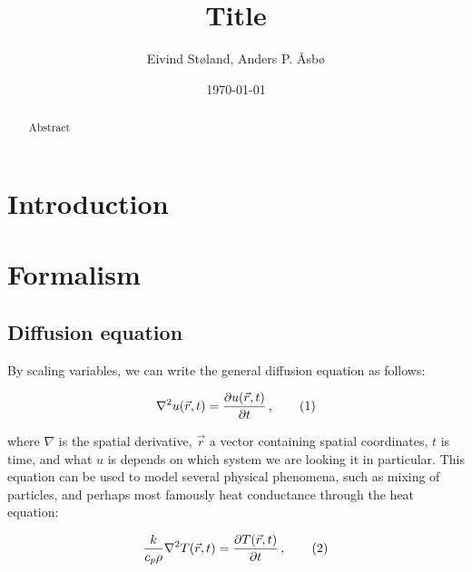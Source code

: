 \documentclass[reprint,english,notitlepage]{revtex4-1}  %
\newcommand\numberthis{\addtocounter{equation}{1}\tag{\theequation}}
\begin{document}
\title{Title}   %
\author{Eivind Støland, Anders P. Åsbø}               %
\date{\today}                             %
\noaffiliation                            %

\begin{abstract}
Abstract
\end{abstract}

\maketitle                                %


\tableofcontents

\section{Introduction} \label{sec:introduction}


\clearpage

\section{Formalism} \label{sec:formalism}

\subsection{Diffusion equation} \label{sec:formalism_diffusion_equation}

By scaling variables, we can write the general diffusion equation as follows:

\begin{align*}
\nabla^2 u(\vec{r},t) = \frac{\partial u(\vec{r},t)}{\partial t} \, , \numberthis \label{eq:3D_diff_eq}
\end{align*}

where $\nabla$ is the spatial derivative, $\vec{r}$ a vector containing spatial coordinates, $t$ is time, and what $u$ is depends on which system we are looking it in particular. This equation can be used to model several physical phenomena, such as mixing of particles, and perhaps most famously heat conductance through the heat equation:

\begin{align*}
\frac{k}{c_p \rho} \nabla^2 T(\vec{r},t) = \frac{\partial T (\vec{r},t)}{\partial t} \, , \numberthis \label{eq:heat_equation_general}
\end{align*}
\end{document}
